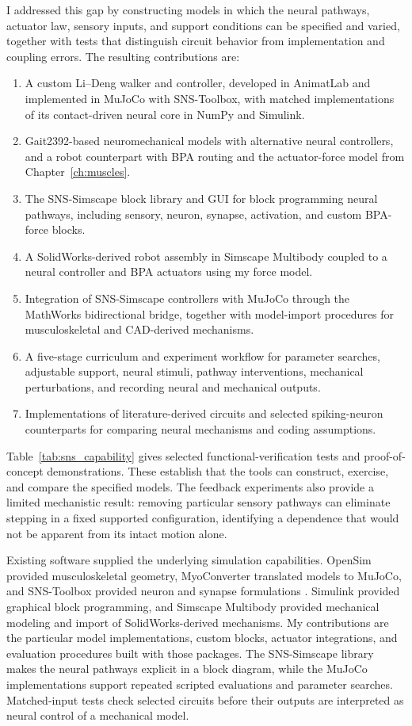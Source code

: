 I addressed this gap by constructing models in which the neural pathways, actuator law, sensory inputs, and support conditions can be specified and varied, together with tests that distinguish circuit behavior from implementation and coupling errors. The resulting contributions are:
\begin{enumerate}
    \item A custom Li--Deng walker and controller, developed in AnimatLab and implemented in MuJoCo with SNS-Toolbox, with matched implementations of its contact-driven neural core in NumPy and Simulink.
    \item Gait2392-based neuromechanical models with alternative neural controllers, and a robot counterpart with BPA routing and the actuator-force model from Chapter~\ref{ch:muscles}.
    \item The SNS-Simscape block library and GUI for block programming neural pathways, including sensory, neuron, synapse, activation, and custom BPA-force blocks.
    \item A SolidWorks-derived robot assembly in Simscape Multibody coupled to a neural controller and BPA actuators using my force model.
    \item Integration of SNS-Simscape controllers with MuJoCo through the MathWorks bidirectional bridge, together with model-import procedures for musculoskeletal and CAD-derived mechanisms.
    \item A five-stage curriculum and experiment workflow for parameter searches, adjustable support, neural stimuli, pathway interventions, mechanical perturbations, and recording neural and mechanical outputs.
    \item Implementations of literature-derived circuits and selected spiking-neuron counterparts for comparing neural mechanisms and coding assumptions.
\end{enumerate}
Table~\ref{tab:sns_capability} gives selected functional-verification tests and proof-of-concept demonstrations. These establish that the tools can construct, exercise, and compare the specified models. The feedback experiments also provide a limited mechanistic result: removing particular sensory pathways can eliminate stepping in a fixed supported configuration, identifying a dependence that would not be apparent from its intact motion alone.

Existing software supplied the underlying simulation capabilities. OpenSim provided musculoskeletal geometry, MyoConverter translated models to MuJoCo, and SNS-Toolbox provided neuron and synapse formulations \citep{delp_opensim_2007, caggiano_myosuite_2022, todorov_mujoco_2012, nourse_sns_2023}. Simulink provided graphical block programming, and Simscape Multibody provided mechanical modeling and import of SolidWorks-derived mechanisms. My contributions are the particular model implementations, custom blocks, actuator integrations, and evaluation procedures built with those packages. The SNS-Simscape library makes the neural pathways explicit in a block diagram, while the MuJoCo implementations support repeated scripted evaluations and parameter searches. Matched-input tests check selected circuits before their outputs are interpreted as neural control of a mechanical model.

